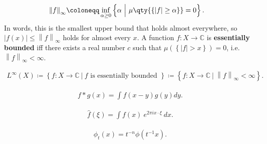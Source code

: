 \begin{definition}

\begin{align*}
{\left\lVert {f} \right\rVert}_\infty &\coloneqq\inf_{\alpha \geq 0} \left\{{\alpha {~\mathrel{\Big|}~}\mu\qty{\left\{{{\left\lvert {f} \right\rvert} \geq \alpha}\right\}} = 0}\right\}
.\end{align*}
In words, this is the smallest upper bound that holds almost everywhere,
so
\({\left\lvert {f(x)} \right\rvert} \leq {\left\lVert {f} \right\rVert}_\infty\)
holds for almost every \(x\). A function \(f:X \to {\mathbb{C}}\) is
\textbf{essentially bounded} iff there exists a real number \(c\) such
that \(\mu(\left\{{{\left\lvert {f} \right\rvert} > x}\right\}) = 0\),
i.e.~\({\left\lVert {f} \right\rVert}_\infty < \infty\).

\end{definition}

\begin{definition}[$L^\infty$]

\begin{align*}
L^\infty(X)
\coloneqq\left\{{f: X\to {\mathbb{C}}{~\mathrel{\Big|}~}f \text{ is essentially bounded }}\right\}
\coloneqq\left\{{f: X\to {\mathbb{C}}{~\mathrel{\Big|}~}{\left\lVert {f} \right\rVert}_{\infty }< \infty}\right\}
.\end{align*}

\end{definition}

\begin{definition}[Convolution]

\begin{align*}f * g(x)=\int f(x-y) g(y) d y .\end{align*}

\end{definition}

\begin{definition}

\begin{align*}
\widehat{f}(\xi) = \int f(x) ~e^{2\pi i x \cdot \xi} ~dx
.\end{align*}

\end{definition}

\begin{definition}[Dilation]

\begin{align*}
\phi_{t}(x) = t^{-n} \phi\left(t^{-1} x\right)
.\end{align*}

\end{definition}

